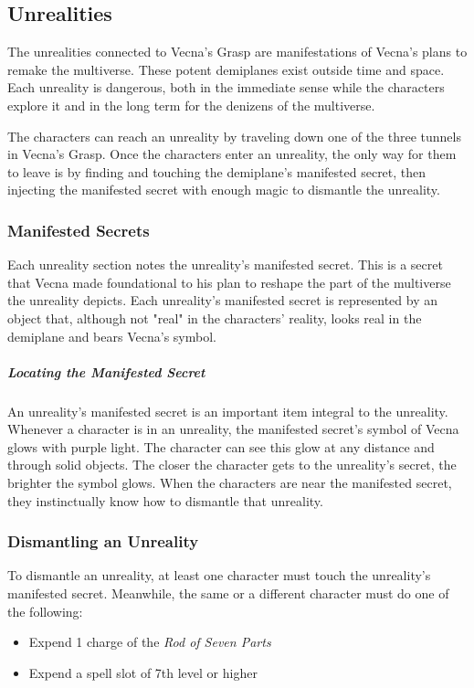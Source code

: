 \documentclass[10pt,a4paper,twoside,bg=print,twocolumn,openany,nodeprecatedcode]{dndbook}
\begin{document}
\subsection{Unrealities}
The unrealities connected to Vecna's Grasp are manifestations of Vecna's plans to remake the multiverse. These potent demiplanes exist outside time and space. Each unreality is dangerous, both in the immediate sense while the characters explore it and in the long term for the denizens of the multiverse.

The characters can reach an unreality by traveling down one of the three tunnels in Vecna's Grasp. Once the characters enter an unreality, the only way for them to leave is by finding and touching the demiplane's manifested secret, then injecting the manifested secret with enough magic to dismantle the unreality.

\subsubsection{Manifested Secrets}
Each unreality section notes the unreality's manifested secret. This is a secret that Vecna made foundational to his plan to reshape the part of the multiverse the unreality depicts. Each unreality's manifested secret is represented by an object that, although not "real" in the characters' reality, looks real in the demiplane and bears Vecna's symbol.

\subparagraph{Locating the Manifested Secret}
An unreality's manifested secret is an important item integral to the unreality. Whenever a character is in an unreality, the manifested secret's symbol of Vecna glows with purple light. The character can see this glow at any distance and through solid objects. The closer the character gets to the unreality's secret, the brighter the symbol glows. When the characters are near the manifested secret, they instinctually know how to dismantle that unreality.

\subsubsection{Dismantling an Unreality}
To dismantle an unreality, at least one character must touch the unreality's manifested secret. Meanwhile, the same or a different character must do one of the following:


\begin{itemize}
\item Expend 1 charge of the \textit{Rod of Seven Parts}
\item Expend a spell slot of 7th level or higher
\end{itemize}
\end{document}
